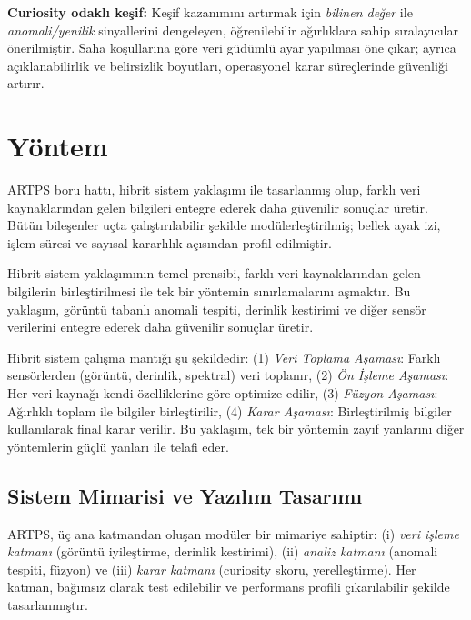 \documentclass[12pt]{article}
\begin{document}
\textbf{Curiosity odaklı keşif:} Keşif kazanımını artırmak için \emph{bilinen değer} ile \emph{anomali/yenilik} sinyallerini dengeleyen, öğrenilebilir ağırlıklara sahip sıralayıcılar önerilmiştir. Saha koşullarına göre veri güdümlü ayar yapılması öne çıkar; ayrıca açıklanabilirlik ve belirsizlik boyutları, operasyonel karar süreçlerinde güvenliği artırır.

\section{Yöntem}
ARTPS boru hattı, hibrit sistem yaklaşımı ile tasarlanmış olup, farklı veri kaynaklarından gelen bilgileri entegre ederek daha güvenilir sonuçlar üretir. Bütün bileşenler uçta çalıştırılabilir şekilde modülerleştirilmiş; bellek ayak izi, işlem süresi ve sayısal kararlılık açısından profil edilmiştir.

Hibrit sistem yaklaşımının temel prensibi, farklı veri kaynaklarından gelen bilgilerin birleştirilmesi ile tek bir yöntemin sınırlamalarını aşmaktır. Bu yaklaşım, görüntü tabanlı anomali tespiti, derinlik kestirimi ve diğer sensör verilerini entegre ederek daha güvenilir sonuçlar üretir.

Hibrit sistem çalışma mantığı şu şekildedir: (1) \emph{Veri Toplama Aşaması}: Farklı sensörlerden (görüntü, derinlik, spektral) veri toplanır, (2) \emph{Ön İşleme Aşaması}: Her veri kaynağı kendi özelliklerine göre optimize edilir, (3) \emph{Füzyon Aşaması}: Ağırlıklı toplam ile bilgiler birleştirilir, (4) \emph{Karar Aşaması}: Birleştirilmiş bilgiler kullanılarak final karar verilir. Bu yaklaşım, tek bir yöntemin zayıf yanlarını diğer yöntemlerin güçlü yanları ile telafi eder.

\subsection{Sistem Mimarisi ve Yazılım Tasarımı}
ARTPS, üç ana katmandan oluşan modüler bir mimariye sahiptir: (i) \emph{veri işleme katmanı} (görüntü iyileştirme, derinlik kestirimi), (ii) \emph{analiz katmanı} (anomali tespiti, füzyon) ve (iii) \emph{karar katmanı} (curiosity skoru, yerelleştirme). Her katman, bağımsız olarak test edilebilir ve performans profili çıkarılabilir şekilde tasarlanmıştır.
\end{document}
